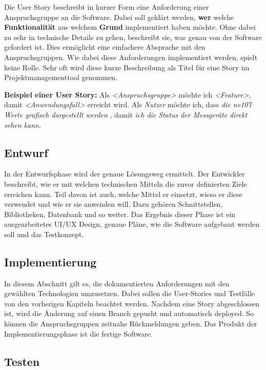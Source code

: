 Die User Story beschreibt in kurzer Form eine Anforderung einer Anspruchsgruppe an die Software. Dabei soll geklärt werden, \textbf{wer} welche \textbf{Funktionalität} aus welchem \textbf{Grund} implementiert haben möchte. Ohne dabei zu sehr in technische Details zu gehen, beschreibt sie, was genau von der Software gefordert ist. Dies ermöglicht eine einfachere Absprache mit den Anspruchsgruppen. Wie dabei diese Anforderungen implementiert werden, spielt keine Rolle. Sehr oft wird diese kurze Beschreibung als Titel für eine Story im Projektmanagementtool genommen.

\textbf{Beispiel einer User Story:}
\newline
Als \textit{<Anspruchsgruppe>} möchte ich \textit{<Feature>}, damit \textit{<Anwendungsfall>} erreicht wird.
\linebreak
\linebreak
Als \textit{Nutzer} möchte ich, dass \textit{die ne107 Werte grafisch dargestellt werden} , damit \textit{ich die Status der Messgeräte direkt sehen kann}.

\subsection{Entwurf}

In der Entwurfsphase wird der genaue Lösungsweg ermittelt. Der Entwickler beschreibt, wie er mit welchen technischen Mitteln die zuvor definierten Ziele erreichen kann. Teil davon ist auch, welche Mittel er einsetzt, wieso er diese verwendet und wie er sie anwenden will. Dazu gehören Schnittstellen, Bibliotheken, Datenbank und so weiter. Das Ergebnis dieser Phase ist ein ausgearbeitetes UI/UX Design, genaue Pläne, wie die Software aufgebaut werden soll und das Testkonzept.

\subsection{Implementierung}

In diesem Abschnitt gilt es, die dokumentierten Anforderungen mit den gewählten Technologien umzusetzen. Dabei sollen die User-Stories und Testfälle von den vorherigen Kapiteln beachtet werden.
\newline
Nachdem eine Story abgeschlossen ist, wird die Änderung auf einen Branch gepusht und automatisch deployed. So können die Anspruchsgruppen zeitnahe Rückmeldungen geben. Das Produkt der Implementierungsphase ist die fertige Software.


\subsection{Testen}


